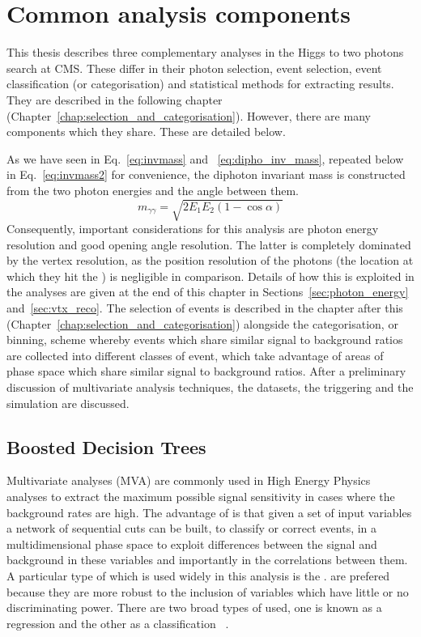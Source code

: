 \chapter{Common analysis components}
\label{chap:common_analysis_components}

This thesis describes three complementary analyses in the Higgs to two photons search at CMS. These differ in their photon selection, event selection, event classification (or categorisation) and statistical methods for extracting results. They are described in the following chapter (Chapter~\ref{chap:selection_and_categorisation}). However, there are many components which they share. These are detailed below.

As we have seen in Eq.~\ref{eq:invmass} and ~\ref{eq:dipho_inv_mass}, repeated below in Eq.~\ref{eq:invmass2} for convenience, the diphoton invariant mass is constructed from the two photon energies and the angle between them. 
\begin{equation}
  m_{\gamma\gamma} = \sqrt{2E_{1}E_{2}(1-\cos\alpha)}
  \label{eq:invmass2}
\end{equation}
Consequently, important considerations for this analysis are photon energy resolution and good opening angle resolution. The latter is completely dominated by the vertex resolution, as the position resolution of the photons (the location at which they hit the \ECAL) is negligible in comparison. Details of how this is exploited in the analyses are given at the end of this chapter in Sections~\ref{sec:photon_energy} and~\ref{sec:vtx_reco}. The selection of events is described in the chapter after this (Chapter~\ref{chap:selection_and_categorisation}) alongside the categorisation, or binning, scheme whereby events which share similar signal to background ratios are collected into different classes of event, which take advantage of areas of phase space which share similar signal to background ratios.
After a preliminary discussion of multivariate analysis techniques, the datasets, the triggering and the \MC simulation are discussed.

\section{Boosted Decision Trees}
\label{sec:bdts}
Multivariate analyses (\acs{MVA}) are commonly used in High Energy Physics analyses to extract the maximum possible signal sensitivity in cases where the background rates are high. The advantage of \MVAs is that given a set of input variables a network of sequential cuts can be built, to classify or correct events, in a multidimensional phase space to exploit differences between the signal and background in these variables and importantly in the correlations between them. A particular type of \MVA which is used widely in this analysis is the \BDT. \BDTs are prefered because they are more robust to the inclusion of variables which have little or no discriminating power. There are two broad types of \BDT used, one is known as a regression \BDT and the other as a classification \BDT~\cite{bdt,bdt2,bdt3}. 

